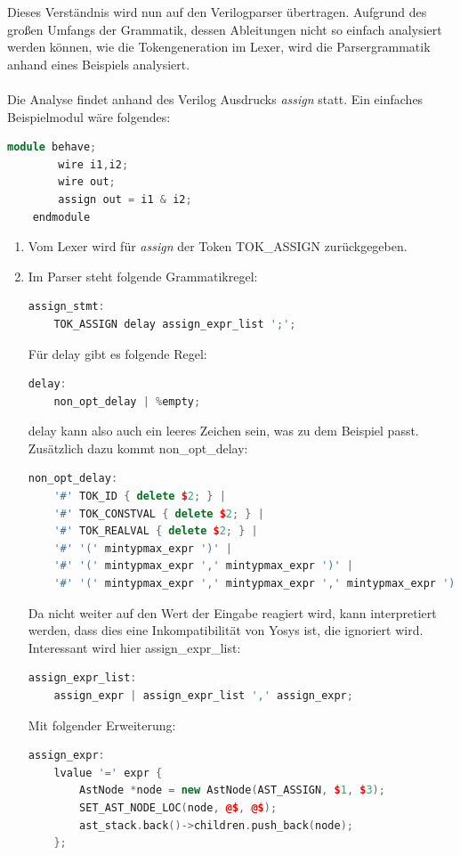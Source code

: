 \documentclass[11pt]{report}
\begin{document}
Dieses Verständnis wird nun auf den Verilogparser übertragen. Aufgrund des großen Umfangs der Grammatik, dessen Ableitungen nicht so einfach analysiert werden können, wie die Tokengeneration im Lexer, wird die Parsergrammatik anhand eines Beispiels analysiert.\\
\\
Die Analyse findet anhand des Verilog Ausdrucks \textit{assign} statt.
Ein einfaches Beispielmodul wäre folgendes:
\begin{lstlisting}[language=C++]
	module behave;
		wire i1,i2;
		wire out;
		assign out = i1 & i2;
	endmodule
\end{lstlisting}
\begin{enumerate}
  \item Vom Lexer wird für \textit{assign} der Token TOK\_ASSIGN zurückgegeben.
  \item Im Parser steht folgende Grammatikregel:
  \begin{lstlisting}[language=C++]
  assign_stmt:
  	TOK_ASSIGN delay assign_expr_list ';';
  \end{lstlisting}
  Für delay gibt es folgende Regel:
  \begin{lstlisting}[language=C++]
  	delay:
	non_opt_delay | %empty;
  \end{lstlisting}
  delay kann also auch ein leeres Zeichen sein, was zu dem Beispiel passt.
  Zusätzlich dazu kommt non\_opt\_delay:
  \begin{lstlisting}[language=C++]
  	non_opt_delay:
	'#' TOK_ID { delete $2; } |
	'#' TOK_CONSTVAL { delete $2; } |
	'#' TOK_REALVAL { delete $2; } |
	'#' '(' mintypmax_expr ')' |
	'#' '(' mintypmax_expr ',' mintypmax_expr ')' |
	'#' '(' mintypmax_expr ',' mintypmax_expr ',' mintypmax_expr ')';
  \end{lstlisting}
  Da nicht weiter auf den Wert der Eingabe reagiert wird, kann interpretiert werden, dass dies eine Inkompatibilität von Yosys ist, die ignoriert wird.\\
  Interessant wird hier assign\_expr\_list:
  \begin{lstlisting}[language=C++]
  	assign_expr_list:
	assign_expr | assign_expr_list ',' assign_expr;
  \end{lstlisting}
  Mit folgender Erweiterung:
  \begin{lstlisting}[language=C++]
  	assign_expr:
	lvalue '=' expr {
		AstNode *node = new AstNode(AST_ASSIGN, $1, $3);
		SET_AST_NODE_LOC(node, @$, @$);
		ast_stack.back()->children.push_back(node);
	};
  \end{lstlisting}

\end{enumerate}
\end{document}
